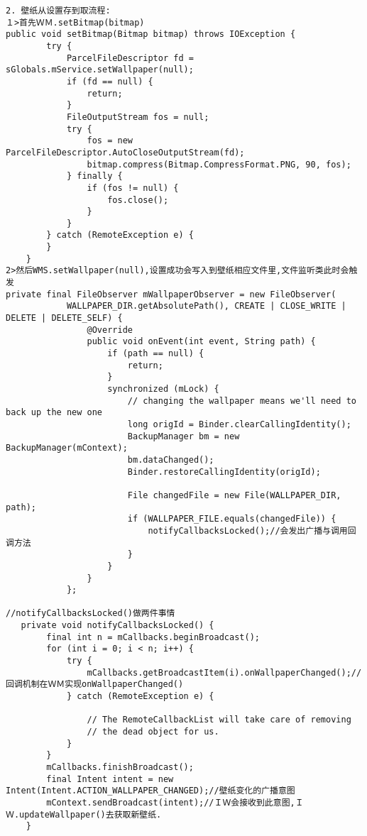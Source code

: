 \documentclass[a4paper,11pt,twoside,openany]{article}%
\begin{document}
\begin{CJK}{UTF8}{song}
\begin{verbatim}
2. 壁纸从设置存到取流程: 
１>首先ＷＭ.setBitmap(bitmap) 
public void setBitmap(Bitmap bitmap) throws IOException { 
        try { 
            ParcelFileDescriptor fd = sGlobals.mService.setWallpaper(null); 
            if (fd == null) { 
                return; 
            } 
            FileOutputStream fos = null; 
            try { 
                fos = new ParcelFileDescriptor.AutoCloseOutputStream(fd); 
                bitmap.compress(Bitmap.CompressFormat.PNG, 90, fos); 
            } finally { 
                if (fos != null) { 
                    fos.close(); 
                } 
            } 
        } catch (RemoteException e) { 
        } 
    } 
2>然后WMS.setWallpaper(null),设置成功会写入到壁纸相应文件里,文件监听类此时会触发 
private final FileObserver mWallpaperObserver = new FileObserver( 
            WALLPAPER_DIR.getAbsolutePath(), CREATE | CLOSE_WRITE | DELETE | DELETE_SELF) { 
                @Override 
                public void onEvent(int event, String path) { 
                    if (path == null) { 
                        return; 
                    } 
                    synchronized (mLock) { 
                        // changing the wallpaper means we'll need to back up the new one 
                        long origId = Binder.clearCallingIdentity(); 
                        BackupManager bm = new BackupManager(mContext); 
                        bm.dataChanged(); 
                        Binder.restoreCallingIdentity(origId); 

                        File changedFile = new File(WALLPAPER_DIR, path); 
                        if (WALLPAPER_FILE.equals(changedFile)) { 
                            notifyCallbacksLocked();//会发出广播与调用回调方法 
                        } 
                    } 
                } 
            }; 

//notifyCallbacksLocked()做两件事情 
   private void notifyCallbacksLocked() { 
        final int n = mCallbacks.beginBroadcast(); 
        for (int i = 0; i < n; i++) { 
            try { 
                mCallbacks.getBroadcastItem(i).onWallpaperChanged();//回调机制在ＷＭ实现onWallpaperChanged() 
            } catch (RemoteException e) { 

                // The RemoteCallbackList will take care of removing 
                // the dead object for us. 
            } 
        } 
        mCallbacks.finishBroadcast(); 
        final Intent intent = new Intent(Intent.ACTION_WALLPAPER_CHANGED);//壁纸变化的广播意图 
        mContext.sendBroadcast(intent);//ＩＷ会接收到此意图,ＩＷ.updateWallpaper()去获取新壁纸. 
    } 


\end{verbatim}
\end{CJK}
\end{document}
